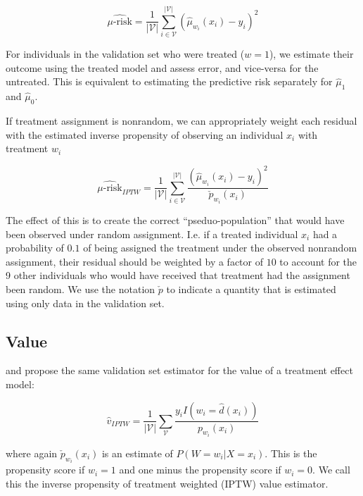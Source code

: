 \begin{equation}
	\widehat{\mu\text{-risk}} = \frac{1}{|\mathcal{V}|} \sum_{i \in \mathcal{V}}^{|\mathcal{V}|}  
	(\hat \mu_{w_i} (x_i) - y_i)^2
\label{murisk}
\end{equation}
 
For individuals in the validation set who were treated ($w=1$), we estimate their outcome using the treated model and assess error, and vice-versa for the untreated. This is equivalent to estimating the predictive risk separately for $\hat\mu_1$ and $\hat\mu_0$. 

If treatment assignment is nonrandom, we can appropriately weight each residual with the estimated inverse propensity of observing an individual $x_i$ with treatment $w_i$

\begin{equation}
	\widehat{\mu\text{-risk}}_{IPTW} = \frac{1}{|\mathcal{V}|} \sum_{i \in \mathcal{V}}^{|\mathcal{V}|}  
	\frac{(\hat \mu_{w_i} (x_i) - y_i)^2}{\check p_{w_i}(x_i)}
\label{murisk-iptw}
\end{equation}

The effect of this is to create the correct ``pseduo-population'' that would have been observed under random assignment. I.e. if a treated individual $x_i$ had a probability of $0.1$ of being assigned the treatment under the observed nonrandom assignment, their residual should be weighted by a factor of $10$ to account for the 9 other individuals who would have received that treatment had the assignment been random. We use the notation $\check p$ to indicate a quantity that is estimated using only data in the validation set.

\subsection{Value}
\label{sec:value}

\citet{Kapelner:3baXYEjR} and \citet{Zhao:2017wa} propose the same validation set estimator for the value of a treatment effect model:

\begin{equation}
\label{value}
\hat v_{IPTW} = \frac{1}{|\mathcal{V}|}\sum_{\mathcal{V}} \frac{y_i I(w_i=\hat d(x_i))}{p_{w_i}(x_i)}
\end{equation}

where again $\check p_{w_i}(x_i)$ is an estimate of $P(W=w_i | X=x_i)$. This is the propensity score if $w_i = 1$ and one minus the propensity score if $w_i = 0$. We call this the inverse propensity of treatment weighted (IPTW) value estimator.

